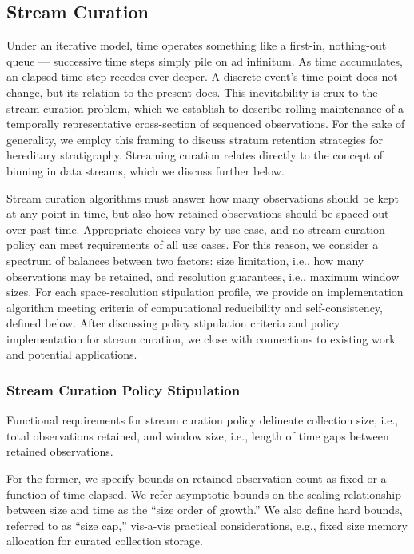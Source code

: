 \subsection{Stream Curation}

Under an iterative model, time operates something like a first-in, nothing-out queue --- successive time steps simply pile on ad infinitum.
As time accumulates, an elapsed time step recedes ever deeper.
A discrete event's time point does not change, but its relation to the present does.  %
This inevitability is crux to the stream curation problem, which we establish to describe rolling maintenance of a temporally representative cross-section of sequenced observations.
For the sake of generality, we employ this framing to discuss stratum retention strategies for hereditary stratigraphy.
Streaming curation relates directly to the concept of binning in data streams, which we discuss further below.

Stream curation algorithms must answer how many observations should be kept at any point in time, but also how retained observations should be spaced out over past time.
Appropriate choices vary by use case, and no stream curation policy can meet requirements of all use cases.
For this reason, we consider a spectrum of balances between two factors: size limitation, i.e., how many observations may be retained, and resolution guarantees, i.e., maximum window sizes.
For each space-resolution stipulation profile, we provide an implementation algorithm meeting criteria of computational reducibility and self-consistency, defined below.
After discussing policy stipulation criteria and policy implementation for stream curation, we close with connections to existing work and potential applications.

\subsubsection{Stream Curation Policy Stipulation}

Functional requirements for stream curation policy delineate collection size, i.e., total observations retained, and window size, i.e., length of time gaps between retained observations.

For the former, we specify bounds on retained observation count as fixed or a function of time elapsed.
We refer asymptotic bounds on the scaling relationship between size and time as  the ``size order of growth.''
We also define hard bounds, referred to as ``size cap,'' vis-a-vis practical considerations, e.g., fixed size memory allocation for curated collection storage.

